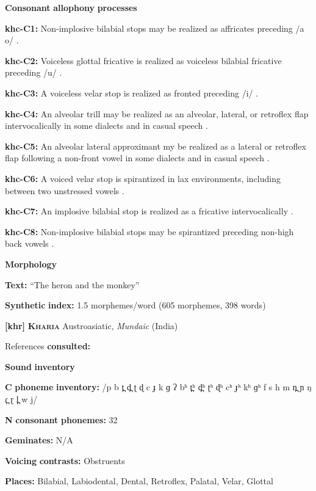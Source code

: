 \begin{styleBody}
\textbf{Consonant} \textbf{allophony} \textbf{processes}

\textbf{khc-C1:} Non-implosive bilabial stops may be realized as affricates preceding /a o/ \citep[16]{Donohue1999}.

\textbf{khc-C2:} Voiceless glottal fricative is realized as voiceless bilabial fricative preceding /u/ \citep[19]{Donohue1999}.

\textbf{khc-C3:} A voiceless velar stop is realized as fronted preceding /i/ \citep[19]{Donohue1999}.

\textbf{khc-C4:} An alveolar trill may be realized as an alveolar, lateral, or retroflex flap intervocalically in some dialects and in casual speech \citep[18]{Donohue1999}.

\textbf{khc-C5:} An alveolar lateral approximant my be realized as a lateral or retroflex flap following a non-front vowel in some dialects and in casual speech \citep[18]{Donohue1999}.

\textbf{khc-C6:} A voiced velar stop is spirantized in lax environments, including between two unstressed vowels \citep[27]{Donohue1999}.

\textbf{khc-C7:} An implosive bilabial stop is realized as a fricative intervocalically \citep[16]{Donohue1999}.

\textbf{khc-C8:} Non-implosive bilabial stops may be spirantized preceding non-high back vowels \citep[16]{Donohue1999}.

\textbf{Morphology}

\textbf{Text:} “The heron and the monkey” \citep[516-520]{Donohue1999}

\textbf{Synthetic} \textbf{index:} 1.5 morphemes/word (605 morphemes, 398 words)

\textbf{[khr]}   \textbf{\textsc{Kharia}}    Austroasiatic, \textit{Mundaic} (India)

References \textbf{consulted:} \citet{Peterson2011}

\textbf{Sound} \textbf{inventory}

\textbf{C} \textbf{phoneme} \textbf{inventory:} /p b t̪ d̪ ʈ ɖ c ɟ k ɡ ʔ bʰ t̪ʰ d̪ʰ ʈʰ ɖʰ cʰ ɟʰ kʰ ɡʰ f s h m n̪ ɲ ŋ ɾ̪ ɽ l̪ w j/

\textbf{N} \textbf{consonant} \textbf{phonemes:} 32

\textbf{Geminates:} N/A

\textbf{Voicing} \textbf{contrasts:} Obstruents

\textbf{Places:} Bilabial, Labiodental, Dental, Retroflex, Palatal, Velar, Glottal


\end{styleBody}
